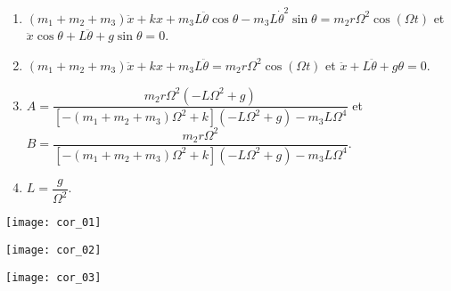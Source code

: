 \ifcolle
\else

\footnotesize
\begin{solution}
\begin{enumerate}
\item $\left( m_1 + m_2 + m_3\right) \ddot{x} + kx + m_3 L\ddot{\theta} \cos \theta - m_3 L\dot{\theta}^2 \sin \theta = m_2 r \Omega^2 \cos \left( \Omega t \right)$ et $\ddot{x}\cos\theta+L\ddot{\theta}+g\sin\theta=0$.
\item $\left( m_1 + m_2 + m_3\right) \ddot{x} + kx + m_3 L\ddot{\theta}= m_2 r \Omega^2 \cos \left( \Omega t \right)$ et $\ddot{x}+L\ddot{\theta}+g\theta=0$.
\item $A=\dfrac{m_2 r \Omega^2 \left( -L\Omega^2 + g\right)}{\left[-\left( m_1 + m_2 + m_3\right)\Omega^2 +k\right]\left( -L\Omega^2 +g\right)-m_3L\Omega^4}$ et 
$B=\dfrac{m_2 r \Omega^2 }{\left[-\left( m_1 + m_2 + m_3\right)\Omega^2 +k\right]\left( -L\Omega^2 +g\right)-m_3L\Omega^4}$.
\item $L=\dfrac{g}{\Omega^2}$.
\end{enumerate}
\end{solution}
\normalsize
\fi


\ifprof
\begin{center}
\texttt{[image: cor\_01]}
\end{center}

\begin{center}
\texttt{[image: cor\_02]}
\end{center}

\begin{center}
\texttt{[image: cor\_03]}
\end{center}
\else
\fi